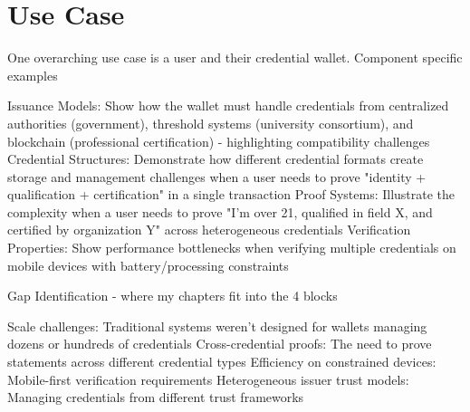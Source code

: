         
  







\section{Use Case}
One overarching use case is a user and their credential wallet.
Component specific examples

Issuance Models: Show how the wallet must handle credentials from centralized authorities (government), threshold systems (university consortium), and blockchain (professional certification) - highlighting compatibility challenges
Credential Structures: Demonstrate how different credential formats create storage and management challenges when a user needs to prove "identity + qualification + certification" in a single transaction
Proof Systems: Illustrate the complexity when a user needs to prove "I'm over 21, qualified in field X, and certified by organization Y" across heterogeneous credentials
Verification Properties: Show performance bottlenecks when verifying multiple credentials on mobile devices with battery/processing constraints

Gap Identification - where my chapters fit into the 4 blocks

Scale challenges: Traditional systems weren't designed for wallets managing dozens or hundreds of credentials
Cross-credential proofs: The need to prove statements across different credential types
Efficiency on constrained devices: Mobile-first verification requirements
Heterogeneous issuer trust models: Managing credentials from different trust frameworks



















